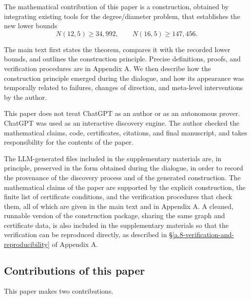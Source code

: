 \documentclass[11pt]{article}
\theoremstyle{definition}
\theoremstyle{remark}
\renewcommand{\_}{\textunderscore\allowbreak}
\begin{document}
The mathematical contribution of this paper is a construction, obtained
by integrating existing tools for the degree/diameter problem, that
establishes the new lower bounds \[
  N(12,5)\ge 34{,}992,
  \qquad
  N(16,5)\ge 147{,}456 .
\]

The main text first states the theorem, compares it with the recorded lower
bounds, and outlines the construction principle. Precise definitions,
proofs, and verification procedures are in Appendix A. We then describe
how the construction principle emerged during the dialogue, and how its
appearance was temporally related to failures, changes of direction, and
meta-level interventions by the author.

This paper does not treat ChatGPT as an author or as an autonomous
prover. ChatGPT was used as an interactive discovery engine. The author
checked the mathematical claims, code, certificates, citations, and
final manuscript, and takes responsibility for the contents of the
paper.

The LLM-generated files included in the supplementary materials are, in
principle, preserved in the form obtained during the dialogue, in order
to record the provenance of the discovery process and of the generated
construction. The mathematical claims of the paper are supported by the
explicit construction, the finite list of certificate conditions, and
the verification procedures that check them, all of which are given in
the main text and in Appendix A.
A cleaned, runnable version of the construction package, sharing the same graph
and certificate data, is also included in the supplementary materials so that the verification can be
reproduced directly, as described in \S\ref{a.8-verification-and-reproducibility} of Appendix A.

\subsection{Contributions of this
paper}\label{contributions-of-this-paper}

This paper makes two contributions.
\end{document}
